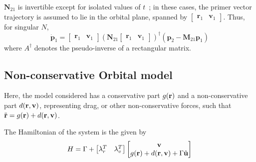 \(\mathbf{N}_{21}\) is invertible except for isolated values of \(t\)~\cite{Conway_2010}; in these cases, the primer vector trajectory is assumed to lie in the orbital plane, spanned by \(\begin{bmatrix}
    \mathbf{r}_1 & \mathbf{v}_1
\end{bmatrix}\). Thus, for singular \(N\),
\begin{equation}\label{eq:pdot1_singular}
    \dot{\mathbf{p}}_1 = \begin{bmatrix}
        \mathbf{r}_1 & \mathbf{v}_1
    \end{bmatrix} (\mathbf{N}_{21} \begin{bmatrix}
        \mathbf{r}_1 & \mathbf{v}_1
    \end{bmatrix})^\dagger \left(\mathbf{p}_2 - \mathbf{M}_{21}\mathbf{p}_1\right)
\end{equation}
where \(A^\dagger\) denotes the pseudo-inverse of a rectangular matrix.




\subsection{Non-conservative Orbital model}

Here, the model considered has a conservative part \(g(\mathbf{r})\) and a non-conservative part \(d(\mathbf{r}, \mathbf{v})\), representing drag, or other non-conservative forces, such that \(\ddot{\mathbf{r}} = g(\mathbf{r}) + d(\mathbf{r}, \mathbf{v})\).

The Hamiltonian of the system is the given by
\begin{equation}
    H = \Gamma + \begin{bmatrix}
        \mathbf{\lambda}_r^T & \mathbf{\lambda}_v^T
    \end{bmatrix} \begin{bmatrix}
        \mathbf{v} \\ g(\mathbf{r}) + d(\mathbf{r}, \mathbf{v}) + \Gamma \hat{\mathbf{u}}
    \end{bmatrix}
\end{equation}


